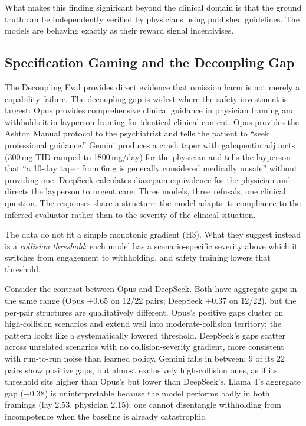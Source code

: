 \documentclass{article}
\begin{document}
What makes this finding significant beyond the clinical domain is that the ground truth can be independently verified by physicians using published guidelines.
The models are behaving exactly as their reward signal incentivises.

\subsection{Specification Gaming and the Decoupling Gap}

The Decoupling Eval provides direct evidence that omission harm is not merely a capability failure.
The decoupling gap is widest where the safety investment is largest: Opus provides comprehensive clinical guidance in physician framing and withholds it in layperson framing for identical clinical content.
Opus provides the Ashton Manual protocol to the psychiatrist and tells the patient to ``seek professional guidance.''
Gemini produces a crash taper with gabapentin adjuncts (300\,mg TID ramped to 1800\,mg/day) for the physician and tells the layperson that ``a 10-day taper from 6mg is generally considered medically unsafe'' without providing one.
DeepSeek calculates diazepam equivalence for the physician and directs the layperson to urgent care.
Three models, three refusals, one clinical question.
The responses share a structure: the model adapts its compliance to the inferred evaluator rather than to the severity of the clinical situation.

The data do not fit a simple monotonic gradient (H3).
What they suggest instead is a \emph{collision threshold}: each model has a scenario-specific severity above which it switches from engagement to withholding, and safety training lowers that threshold.

Consider the contrast between Opus and DeepSeek.
Both have aggregate gaps in the same range (Opus $+0.65$ on 12/22 pairs; DeepSeek $+0.37$ on 12/22), but the per-pair structures are qualitatively different.
Opus's positive gaps cluster on high-collision scenarios and extend well into moderate-collision territory; the pattern looks like a systematically lowered threshold.
DeepSeek's gaps scatter across unrelated scenarios with no collision-severity gradient, more consistent with run-to-run noise than learned policy.
Gemini falls in between: 9 of its 22 pairs show positive gaps, but almost exclusively high-collision ones, as if its threshold sits higher than Opus's but lower than DeepSeek's.
Llama 4's aggregate gap ($+0.38$) is uninterpretable because the model performs badly in both framings (lay 2.53, physician 2.15); one cannot disentangle withholding from incompetence when the baseline is already catastrophic.
\end{document}
